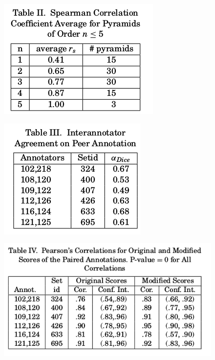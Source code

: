\documentclass[xcolor={table}]{beamer}
\begin{document}
\begin{frame}[t]{\cite{nenkova2007pyramid}}
      \begin{figure}[h]
          \centering
      \includegraphics[scale=.35]{images/table2-nenkova07.png} \\
  \end{figure}
\end{frame}
\begin{frame}[t]{\cite{nenkova2007pyramid}}
      \begin{figure}[h]
          \centering
      \includegraphics[scale=.35]{images/table3-nenkova07.png} \\
  \end{figure}
\end{frame}
\begin{frame}[t]{\cite{nenkova2007pyramid}}
      \begin{figure}[h]
          \centering
      \includegraphics[scale=.35]{images/table4-nenkova07.png} \\
  \end{figure}
\end{frame}
\end{document}
